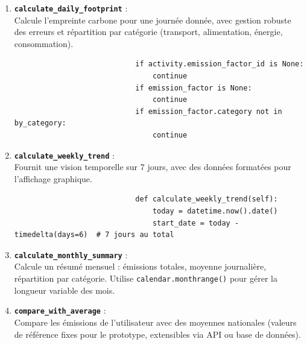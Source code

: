 \documentclass[a4paper,11pt]{article}
\begin{document}
            \begin{enumerate}
                \item \textbf{\texttt{calculate\_daily\_footprint}} :\\
                    Calcule l'empreinte carbone pour une journée donnée, avec gestion robuste des erreurs et répartition par catégorie (transport, alimentation, énergie, consommation).

                    \begin{tcolorbox}[colback=lightgray!6, colframe=black, left=-45mm, right=5mm, top=2mm, bottom=0mm, boxrule=0.1mm]
                        \begin{verbatim}
                            if activity.emission_factor_id is None:
                                continue
                            if emission_factor is None:
                                continue
                            if emission_factor.category not in by_category:
                                continue
                        \end{verbatim}
                    \end{tcolorbox}

                \item \textbf{\texttt{calculate\_weekly\_trend}} :\\
                    Fournit une vision temporelle sur 7 jours, avec des données formatées pour l'affichage graphique.

                    \begin{tcolorbox}[colback=lightgray!6, colframe=black, left=-45mm, right=5mm, top=2mm, bottom=0mm, boxrule=0.1mm]
                        \begin{verbatim}
                            def calculate_weekly_trend(self):
                                today = datetime.now().date()
                                start_date = today - timedelta(days=6)  # 7 jours au total
                        \end{verbatim}
                    \end{tcolorbox}

                \item \textbf{\texttt{calculate\_monthly\_summary}} :\\
                    Calcule un résumé mensuel : émissions totales, moyenne journalière, répartition par catégorie. Utilise \texttt{calendar.monthrange()} pour gérer la longueur variable des mois.

                \item \textbf{\texttt{compare\_with\_average}} :\\
                    Compare les émissions de l'utilisateur avec des moyennes nationales (valeurs de référence fixes pour le prototype, extensibles via API ou base de données).
            \end{enumerate}
\end{document}
